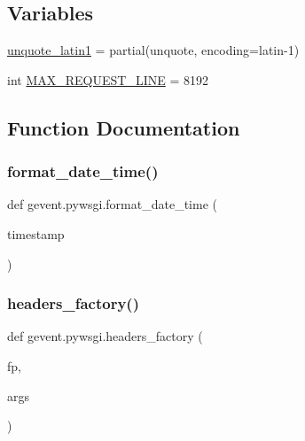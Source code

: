 \subsection*{Variables}
\begin{DoxyCompactItemize}
\item 
\hyperlink{namespacegevent_1_1pywsgi_ac8a5c9c1809ca6e181f44fb1551aba6c}{unquote\+\_\+latin1} = partial(unquote, encoding=\textquotesingle{}latin-\/1\textquotesingle{})
\item 
int \hyperlink{namespacegevent_1_1pywsgi_a210cb98c4dc71b27ff51f2eff53224c5}{M\+A\+X\+\_\+\+R\+E\+Q\+U\+E\+S\+T\+\_\+\+L\+I\+NE} = 8192
\end{DoxyCompactItemize}


\subsection{Function Documentation}
\mbox{\label{namespacegevent_1_1pywsgi_a3eed08f5efcf9b013a5a8db9270c954d}} 
\subsubsection{\texorpdfstring{format\+\_\+date\+\_\+time()}{format\_date\_time()}}
{\footnotesize\ttfamily def gevent.\+pywsgi.\+format\+\_\+date\+\_\+time (\begin{DoxyParamCaption}\item[{}]{timestamp }\end{DoxyParamCaption})}

\mbox{\label{namespacegevent_1_1pywsgi_a82daeec2a9f485ab21656054c259cf75}} 
\subsubsection{\texorpdfstring{headers\+\_\+factory()}{headers\_factory()}}
{\footnotesize\ttfamily def gevent.\+pywsgi.\+headers\+\_\+factory (\begin{DoxyParamCaption}\item[{}]{fp,  }\item[{}]{args }\end{DoxyParamCaption})}



